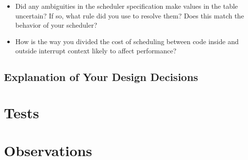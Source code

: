 \begin{enumerate}
\begin{itemize}
            \item Did any ambiguities in the scheduler specification make values in the table uncertain?  If so, what rule did you use to resolve them?  Does this match the behavior of your scheduler?
            
            \item How is the way you divided the cost of scheduling between code inside and outside interrupt context likely to affect performance?

        \end{itemize}

    
\end{enumerate}


\subsection{Explanation of Your Design Decisions}




\section{Tests}



\section{Observations}

